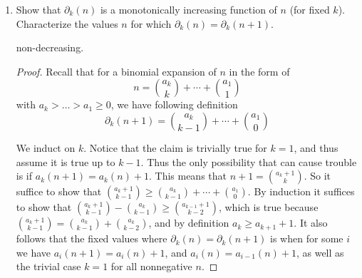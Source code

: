 \documentclass{article}
\begin{document}
\begin{enumerate}
\begin{solution}
\begin{enumerate}[label=(\roman*)]
    \item We use the Kruskal-Katona theorem, which say that $f$ is the $f$-vector of a simplicial complex $\Delta_f$ if and only if $f_{-1} = 1$ and $f_{k-1} \geq \partial_{k+1}(f_k)$ for $0 \leq k \leq d-1$. Through a direct computation we see that these relations are all satisfied, so $f$ is indeed a valid $f$-vector for some simplicial complex. In fact, we can explicitly construct it: consider the following maximal faces
    \[\{12345, 12346, 12356, 12456, 13456, 23456, 12347, 12357, 12457, 13457, 23457, 12367, \]
    \[1238, 1248, 1348, 378, 478, 578, 678\}\]
    combined with all edges $\binom{[10]}{2}$ and two extra $\{1, 11\}, \{2, 11\}$, and leave the remaining vertices isolated. One can count that this gives the desired vector $f$.
    \item No. Using Stanley's trick, we compute its $h$-vector to be $h = (1, 18, -35, 39, -12, 1)$. Since it is negative, $\Delta_f$ cannot be shellable.
    \item We see that in the $h$-vector, $h_k \neq h_{d-k}$, which violates the Dehn-Sommerville relations, and thus this is not the $f$-vector for a simplicial polytope.
\end{enumerate}
\end{solution}

\item Show that $\partial_k(n)$ is a monotonically increasing function of $n$ (for fixed $k$). Characterize the values $n$ for which $\partial_k(n)=\partial_k(n+1)$.

\begin{remark}
    non-decreasing.
\end{remark}

\begin{proof}
Recall that for a binomial expansion of $n$ in the form of
\[n = \binom{a_k}{k} + \cdots + \binom{a_1}{1}\]
with $a_k > \ldots > a_1 \geq 0$, we have following definition
\[\partial_k(n+1) = \binom{a_k}{k-1} + \cdots + \binom{a_1}{0}\]

We induct on $k$. Notice that the claim is trivially true for $k=1$, and thus assume it is true up to $k-1$. Thus the only possibility that can cause trouble is if $a_{k}(n+1) = a_k(n) + 1$. This means that $n+1 = \binom{a_k + 1}{k}$. So it suffice to show that $\binom{a_k + 1}{k-1} \geq \binom{a_k}{k-1} + \cdots + \binom{a_1}{0}$. By induction it suffices to show that $\binom{a_k + 1}{k-1} - \binom{a_k}{k-1} \geq \binom{a_{k-1}+1}{k-2}$, which is true because $\binom{a_k + 1}{k-1} = \binom{a_k}{k-1} + \binom{a_k}{k-2}$, and by definition $a_k \geq a_{k+1}+1$. It also follows that the fixed values where $\partial_k(n)=\partial_k(n+1)$ is when for some $i$ we have $a_i(n+1) = a_i(n) + 1$, and $a_i(n) = a_{i-1}(n)+1$, as well as the trivial case $k=1$ for all nonnegative $n$.
\end{proof}


\end{enumerate}
\end{document}
